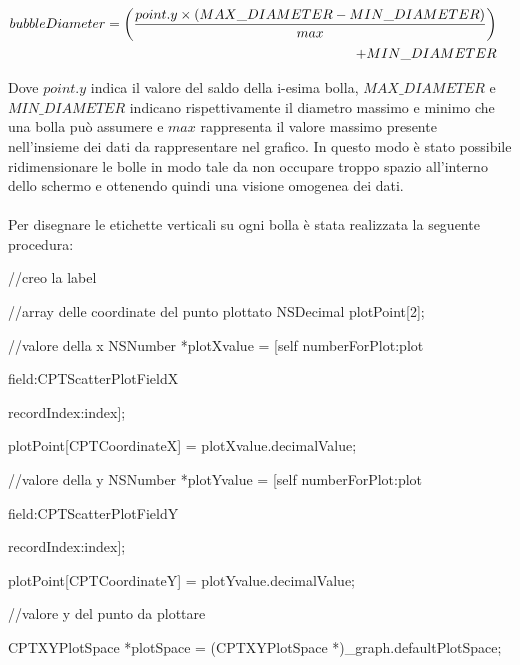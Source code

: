 \begin{align}
  &\begin{aligned}
      bubbleDiameter = \biggl({point.y \times (MAX\_DIAMETER - MIN\_DIAMETER)  \over max }\biggr) \\ + MIN\_DIAMETER
  \end{aligned}
\end{align}


Dove $point.y$ indica il valore del saldo della i-esima bolla, $MAX\_DIAMETER$ e $MIN\_DIAMETER$ indicano rispettivamente il diametro massimo e minimo che una bolla può assumere e $max$ rappresenta il valore massimo presente nell'insieme dei dati da rappresentare nel grafico.
In questo modo è stato possibile ridimensionare le bolle in modo tale da non occupare troppo spazio all'interno dello schermo e ottenendo quindi una visione omogenea dei dati.
\\\\
Per disegnare le etichette verticali su ogni bolla è stata realizzata la seguente procedura:

//creo la label
    

    

    //array delle coordinate del punto plottato
    NSDecimal plotPoint[2];

    //valore della x
    NSNumber *plotXvalue = [self numberForPlot:plot

                                         field:CPTScatterPlotFieldX

                                   recordIndex:index];

    plotPoint[CPTCoordinateX] = plotXvalue.decimalValue;

    

    //valore della y
    NSNumber *plotYvalue = [self numberForPlot:plot

                                         field:CPTScatterPlotFieldY

                                   recordIndex:index];

    plotPoint[CPTCoordinateY] = plotYvalue.decimalValue;

    

    //valore y del punto da plottare

    CPTXYPlotSpace *plotSpace = (CPTXYPlotSpace *)_graph.defaultPlotSpace;

